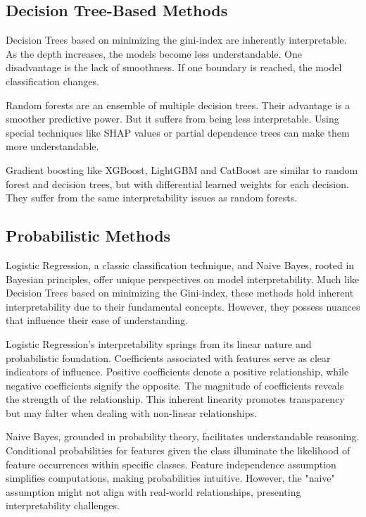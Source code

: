 \subsection{Decision Tree-Based Methods}

Decision Trees based on minimizing the gini-index are inherently interpretable. As the depth increases, the models become less understandable. One disadvantage is the lack of smoothness. If one boundary is reached, the model classification changes.

Random forests are an ensemble of multiple decision trees. Their advantage is a smoother predictive power. But it suffers from being less interpretable. Using special techniques like SHAP values or partial dependence trees can make them more understandable.

Gradient boosting like XGBoost, LightGBM and CatBoost are similar to random forest and decision trees, but with differential learned weights for each decision. They suffer from the same interpretability issues as random  forests.

\subsection{Probabilistic Methods}

Logistic Regression, a classic classification technique, and Naive Bayes, rooted in Bayesian principles, offer unique perspectives on model interpretability. Much like Decision Trees based on minimizing the Gini-index, these methods hold inherent interpretability due to their fundamental concepts. However, they possess nuances that influence their ease of understanding.

Logistic Regression's interpretability springs from its linear nature and probabilistic foundation. Coefficients associated with features serve as clear indicators of influence. Positive coefficients denote a positive relationship, while negative coefficients signify the opposite. The magnitude of coefficients reveals the strength of the relationship. This inherent linearity promotes transparency but may falter when dealing with non-linear relationships.

Naive Bayes, grounded in probability theory, facilitates understandable reasoning. Conditional probabilities for features given the class illuminate the likelihood of feature occurrences within specific classes. Feature independence assumption simplifies computations, making probabilities intuitive. However, the "naive" assumption might not align with real-world relationships, presenting interpretability challenges.


